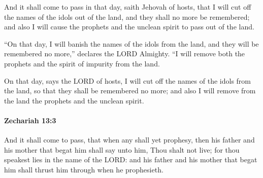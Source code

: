 			\begin{versebox}
					\item[BHS] 
					\item[LXX] 
					\item[ASV] And it shall come to pass in that day, saith Jehovah of hosts, that I will cut off the names of the idols out of the land, and they shall no more be remembered; and also I will cause the prophets and the unclean spirit to pass out of the land.
					\item[NIV] “On that day, I will banish the names of the idols from the land, and they will be remembered no more,” declares the LORD Almighty. “I will remove both the prophets and the spirit of impurity from the land.
					\item[NRSV] On that day, says the LORD of hosts, I will cut off the names of the idols from the land, so that they shall be remembered no more; and also I will remove from the land the prophets and the unclean spirit.
			\end{versebox}

		\paragraph{Zechariah 13:3} %
			\label{ZECHARIAH-13-3}

			And it shall come to pass, that when any shall yet prophesy, then his father and his mother that begat him shall say unto him, Thou shalt not live; for thou speakest lies in the name of the LORD: and his father and his mother that begat him shall thrust him through when he prophesieth.

